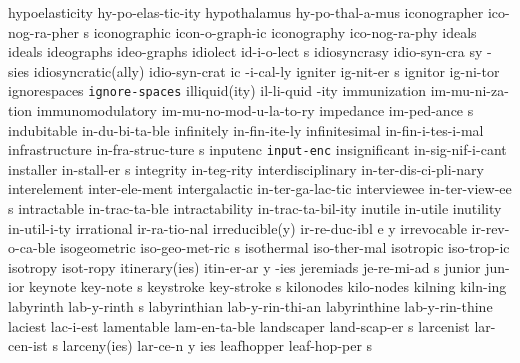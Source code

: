 \1 hypoelasticity	hy-po-elas-tic-ity	%
\1 hypothalamus 	hy-po-thal-a-mus 
\5 iconographer		ico-nog-ra-pher s	%
\1 iconographic		icon-o-graph-ic		%
\1 iconography		ico-nog-ra-phy		%
\1 ideals		ideals
\1 ideographs		ideo-graphs
\NewWordtrue
\5 idiolect		id-i-o-lect s		%
\6 idiosyncrasy 	idio-syn-cra sy -sies
\3 idiosyncratic(ally)	idio-syn-crat ic -i-cal-ly
\5 igniter		ig-nit-er s
\1 ignitor		ig-ni-tor
\1 ignorespaces 	{\tt\bs ignore-spaces}
\2 illiquid(ity)	il-li-quid -ity		%
\1 immunization 	im-mu-ni-za-tion	%
\1 immunomodulatory	im-mu-no-mod-u-la-to-ry	%
\5 impedance		im-ped-ance s
\1 indubitable		in-du-bi-ta-ble		%
\1 infinitely		in-fin-ite-ly
\1 infinitesimal	in-fin-i-tes-i-mal
\5 infrastructure	in-fra-struc-ture s
\1 inputenc		{\tt input-enc}		%
\NewWordtrue
\1 insignificant	in-sig-nif-i-cant	%
\5 installer		in-stall-er s		%
\1 integrity		in-teg-rity		%
\1 interdisciplinary	in-ter-dis-ci-pli-nary
\NewWordtrue
\1 interelement		inter-ele-ment		%
\1 intergalactic	in-ter-ga-lac-tic
\5 interviewee		in-ter-view-ee s	%
\NewWordtrue
\1 intractable	 	in-trac-ta-ble		%
\NewWordtrue
\1 intractability	in-trac-ta-bil-ity	%
\1 inutile		in-utile
\1 inutility		in-util-i-ty
\1 irrational		ir-ra-tio-nal		%
\3 irreducible(y)       ir-re-duc-ibl e y       %
\1 irrevocable		ir-rev-o-ca-ble
\5 isogeometric		iso-geo-met-ric s	%
\1 isothermal		iso-ther-mal		%
\1 isotropic		iso-trop-ic		%
\1 isotropy		isot-ropy		%
\3 itinerary(ies)	itin-er-ar y -ies
\5 jeremiads		je-re-mi-ad s
\NewWordtrue
\1 junior		jun-ior 		%
\5 keynote		key-note s		%
\5 keystroke		key-stroke s
\1 kilonodes		kilo-nodes		%
\1 kilning		kiln-ing
\NewWordtrue
\5 labyrinth		lab-y-rinth s		%
\NewWordtrue
\1 labyrinthian		lab-y-rin-thi-an	%
\NewWordtrue
\1 labyrinthine		lab-y-rin-thine		%
\1 laciest		lac-i-est
\1 lamentable		lam-en-ta-ble
\5 landscaper		land-scap-er s
\5 larcenist		lar-cen-ist s
\3 larceny(ies) 	lar-ce-n y ies
\5 leafhopper		leaf-hop-per s	%
